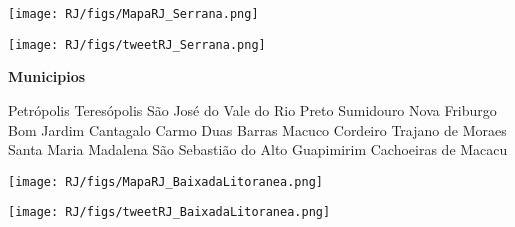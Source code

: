 \documentclass[10pt]{article} %
\begin{document}
\begin{minipage}[t]{.66\linewidth}
\hypertarget{Srrn}{}
\texttt{[image: RJ/figs/MapaRJ\_Serrana.png]}\vspace{0.5cm}\begin{center}

\end{center}
\vspace{0.5cm}\begin{center}
\texttt{[image: RJ/figs/tweetRJ\_Serrana.png]}\end{center}
\end{minipage}\hfill\begin{minipage}[t]{.30\linewidth}
\begin{mdframed}[style=sidebar,frametitle={}]
\textbf{Municipios}\begin{itemize}\ysquare Petrópolis 
\wsquare Teresópolis 
\wsquare São José do Vale do Rio Preto 
\wsquare Sumidouro 
\ysquare Nova Friburgo 
\wsquare Bom Jardim 
\wsquare Cantagalo 
\ysquare Carmo 
\wsquare Duas Barras 
\wsquare Macuco 
\ysquare Cordeiro 
\wsquare Trajano de Moraes 
\wsquare Santa Maria Madalena 
\wsquare São Sebastião do Alto 
\ysquare Guapimirim 
\wsquare Cachoeiras de Macacu 
\end{itemize}\BackToContents\end{mdframed}\hfill\end{minipage}\newpage\begin{minipage}[t]{.66\linewidth}
\hypertarget{BxdL}{}
\texttt{[image: RJ/figs/MapaRJ\_BaixadaLitoranea.png]}\vspace{0.5cm}\begin{center}

\end{center}
\vspace{0.5cm}\begin{center}
\texttt{[image: RJ/figs/tweetRJ\_BaixadaLitoranea.png]}\end{center}
\end{minipage}\hfill\begin{minipage}[t]{.30\linewidth}

\end{minipage}
\end{document}
